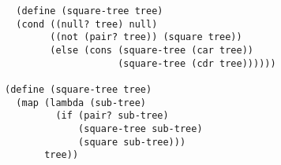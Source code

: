 \documentclass[a4paper,12pt]{article}
\begin{document}
\begin{lstlisting}
  (define (square-tree tree)
  (cond ((null? tree) null)
        ((not (pair? tree)) (square tree))
        (else (cons (square-tree (car tree))
                    (square-tree (cdr tree))))))

(define (square-tree tree)
  (map (lambda (sub-tree)
         (if (pair? sub-tree)
             (square-tree sub-tree)
             (square sub-tree)))
       tree))
\end{lstlisting}
\end{document}
